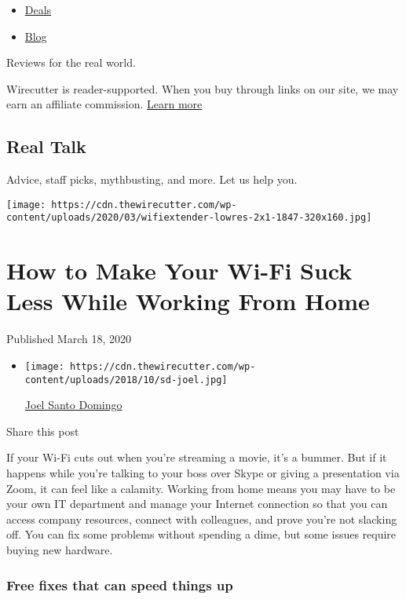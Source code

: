 \begin{itemize}
\tightlist
\item
  \href{/wirecutter/deals/}{Deals}
\item
  \href{/wirecutter/blog/}{Blog}
\end{itemize}

Reviews for the real world.

Wirecutter is reader-supported. When you buy through links on our site,
we may earn an affiliate commission. \href{/wirecutter/about/}{Learn
more}

\hypertarget{real-talk}{%
\subsection{Real Talk}\label{real-talk}}

Advice, staff picks, mythbusting, and more. Let us help you.

\texttt{[image: https://cdn.thewirecutter.com/wp-content/uploads/2020/03/wifiextender-lowres-2x1-1847-320x160.jpg]}

\hypertarget{how-to-make-your-wi-fi-suck-less-while-working-from-home}{%
\section{How to Make Your Wi-Fi Suck Less While Working From
Home}\label{how-to-make-your-wi-fi-suck-less-while-working-from-home}}

Published March 18, 2020

\begin{itemize}
\item
  \texttt{[image: https://cdn.thewirecutter.com/wp-content/uploads/2018/10/sd-joel.jpg]}

  \href{https://www.nytimes.com/wirecutter/authors/joel-santo-domingo/}{Joel
  Santo Domingo}
\end{itemize}

Share this post

If your Wi-Fi cuts out when you're streaming a movie, it's a bummer. But
if it happens while you're talking to your boss over Skype or giving a
presentation via Zoom, it can feel like a calamity. Working from home
means you may have to be your own IT department and manage your Internet
connection so that you can access company resources, connect with
colleagues, and prove you're not slacking off. You can fix some problems
without spending a dime, but some issues require buying new hardware.

\hypertarget{free-fixes-that-can-speed-things-up}{%
\subsubsection{Free fixes that can speed things
up}\label{free-fixes-that-can-speed-things-up}}

